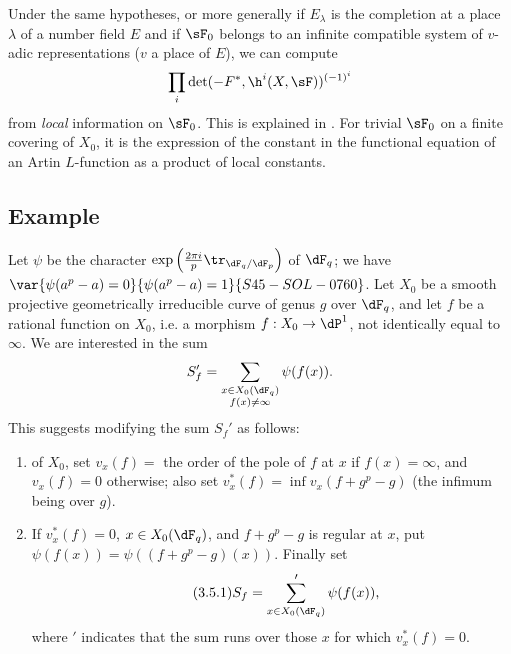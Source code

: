 Under the same hypotheses, or more generally if $E_\lambda$ is the 
completion at a place $\lambda$ of a number field $E$ and if $\sF_0$ 
belongs to an infinite compatible system of $v$-adic representations 
($v$ a place of $E$), we can compute 
\[
  \prod_i \det(-F^\ast,\h^i(X,\sF))^{(-1)^i} 
\]
from \emph{local} information on $\sF_0$. This is explained in 
\cite{de73}. For trivial $\sF_0$ on a finite covering of $X_0$, it is 
the expression of the constant in the functional equation of an Artin 
$L$-function as a product of local constants. 





\subsection{Example}\label{VI:3-5}

Let $\psi$ be the character 
$\exp\left(\frac{2\pi i}{p} \tr_{\dF_q/\dF_p}\right)$ of $\dF_q$; we have 
$\var{\psi(a^p-a)=0}{\psi(a^p-a)=1}{S45-SOL-0760}$. Let $X_0$ be a smooth projective geometrically 
irreducible curve of genus $g$ over $\dF_q$, and let $f$ be a rational function on 
$X_0$, i.e. a morphism $f:X_0 \to \dP^1$, not identically equal to 
$\infty$. We are interested in the sum 
\[
  S_f' = \sum_{\substack{x\in X_0(\dF_q) \\ f(x)\ne \infty}} \psi(f(x)) 
  \text{.}
\]
 This suggests modifying 
the sum $S_f'$ as follows: 
\begin{enumerate}[\indent a)]
  \item {} of $X_0$, set $v_x(f) = $ the order of the 
    pole of $f$ at $x$ if $f(x)=\infty$, and $v_x(f)=0$ otherwise; also set 
    $v_x^\ast(f) = \inf v_x(f+g^p-g)$ (the infimum being over $g$). 
  \item If $v_x^\ast(f)=0$, $x\in X_0(\dF_q)$, and $f+g^p-g$ is 
    regular at $x$, put $\psi(f(x)) = \psi((f+g^p-g)(x))$. Finally set 
\begin{equation*}\tag{3.5.1}\label{VI:eq:3-5-1}
      S_f = \sum'_{x\in X_0(\dF_q)} \psi(f(x)) \text{,}
    \end{equation*}
    where $\prime$ indicates that the sum runs over those $x$ for which 
    $v_x^\ast(f)=0$. 
\end{enumerate}

